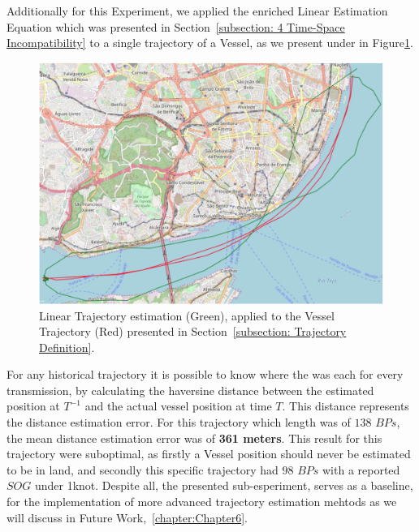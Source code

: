 Additionally for this Experiment, we applied the enriched Linear Estimation Equation which was presented in Section~\ref{subsection: 4 Time-Space Incompatibility} to a single trajectory of a Vessel, as we present under in Figure\ref{fig: Chapter 5 SMM linear estimation}. 
\begin{figure}[H]
	\centering
	\includegraphics[scale = 0.75]{figures/Ch5/SMM_Estimation_Croped.pdf}
    \caption{Linear Trajectory estimation (Green), applied to the Vessel Trajectory (Red) presented in Section~\ref{subsection: Trajectory Definition}.}
    \label{fig: Chapter 5 SMM linear estimation}
\end{figure}
For any historical trajectory it is possible to know where the was each for every transmission, by calculating the haversine distance between the estimated position at $T^{-1}$ and the actual vessel position at time $T$. This distance represents the distance estimation error. For this trajectory which length was of $138$ $BPs$, the mean distance estimation error was of \textbf{361 meters}. This result for this trajectory were suboptimal, as firstly a Vessel position should never be estimated to be in land, and secondly this specific trajectory had $98$ $BPs$ with a reported $SOG$ under 1knot. Despite all, the presented sub-esperiment, serves as a baseline, for the implementation of more advanced trajectory estimation mehtods as we will discuss in Future Work,~\ref{chapter:Chapter6}.

